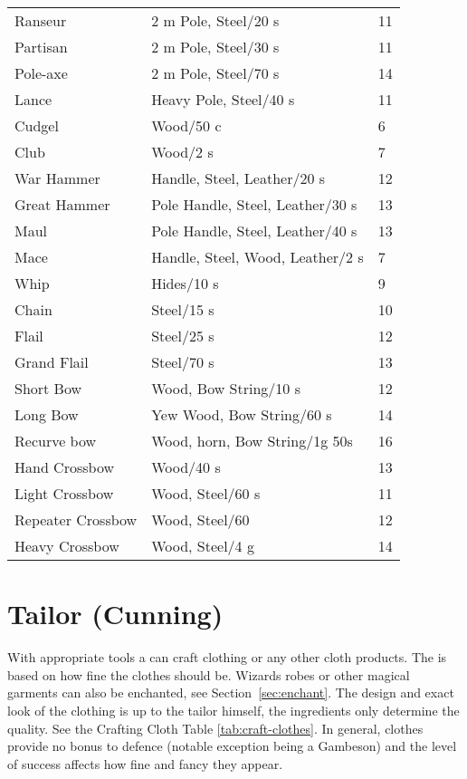 \documentclass[a4paper,11pt,oneside]{book}
\newcommand{\textlf}[1]{\textbf{\titlecap{#1}}}
\begin{document}
\begin{table}[!ht]
\begin{tabular}{|l|l|l|}
    Ranseur & 2 m Pole, Steel/20 s & 11\\
    Partisan & 2 m Pole, Steel/30 s & 11\\
    Pole-axe & 2 m Pole, Steel/70 s & 14\\
    Lance & Heavy Pole, Steel/40 s & 11\\
    \hline
    Cudgel & Wood/50 c & 6\\
    Club & Wood/2 s & 7\\
    War Hammer & Handle, Steel, Leather/20 s & 12 \\
    Great Hammer & Pole Handle, Steel, Leather/30 s & 13 \\
    Maul & Pole Handle, Steel, Leather/40 s & 13 \\
    Mace & Handle, Steel, Wood, Leather/2 s & 7 \\
    \hline
    Whip & Hides/10 s & 9\\
    Chain & Steel/15 s & 10\\
    Flail & Steel/25 s & 12\\   
    Grand Flail & Steel/70 s & 13\\ 
    \hline
    Short Bow & Wood, Bow String/10 s & 12\\
    Long Bow & Yew Wood, Bow String/60 s & 14\\
    Recurve bow & Wood, horn, Bow String/1g 50s & 16 \\
    \hline
    Hand Crossbow & Wood/40 s & 13 \\ 
    Light Crossbow & Wood, Steel/60 s & 11\\
    Repeater Crossbow & Wood, Steel/60 & 12 \\
    Heavy Crossbow & Wood, Steel/4 g & 14\\
    \hline
    \end{tabular}
\end{table}



\section{Tailor (Cunning)}
With appropriate tools a \textlf{Tailor} can craft clothing or any other cloth products. The \textlf{difficulty} is based on how fine the clothes should be. Wizards robes or other magical garments can also be enchanted, see Section~\ref{sec:enchant}. The design and exact look of the clothing is up to the tailor himself, the ingredients only determine the quality. See the Crafting Cloth Table \ref{tab:craft-clothes}. In general, clothes provide no bonus to defence (notable exception being a Gambeson) and the level of success affects how fine and fancy they appear.
\end{document}
